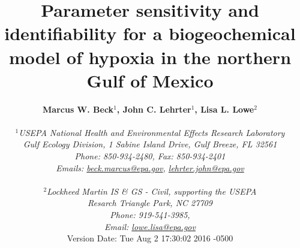 \documentclass[letterpaper,12pt,oneside]{article}\usepackage[]{graphicx}\usepackage[]{color}
\begin{document}
\raggedbottom
\linenumbers
\raggedright
{}
\setlength{\parindent}{0.5in}
\renewcommand\refname{References \vspace{12pt}}

\begin{singlespace}
\title{{\bf {\Large Parameter sensitivity and identifiability for a biogeochemical model of hypoxia in the northern {G}ulf of {M}exico}}}
\author{
  {\bf {\normalsize Marcus W. Beck$^1$, John C. Lehrter$^1$, Lisa L. Lowe$^2$}}
  \\\\{\textit {\normalsize $^1$USEPA National Health and Environmental Effects Research Laboratory}}
  \\{\textit {\normalsize Gulf Ecology Division, 1 Sabine Island Drive, Gulf Breeze, FL 32561}}
	\\{\textit {\normalsize Phone: 850-934-2480, Fax: 850-934-2401}}
	\\{\textit {\normalsize Emails: \href{mailto:beck.marcus@epa.gov}{beck.marcus@epa.gov}, \href{mailto:lehrter.john@epa.gov}{lehrter.john@epa.gov}}}
	\\\\{\textit {\normalsize $^2$Lockheed Martin IS \& GS - Civil, supporting the USEPA}}
	\\{\textit {\normalsize Resarch Triangle Park, NC 27709}}
	\\{\textit {\normalsize Phone: 919-541-3985,}}
	\\{\textit {\normalsize Email: \href{mailto:lowe.lisa@epa.gov}{lowe.lisa@epa.gov}}}
  \vspace{1in} 
  \\ Version Date:   Tue Aug 2 17:30:02 2016 -0500
	}
\date{}
\maketitle
\end{singlespace}
\clearpage
\end{document}
